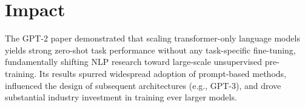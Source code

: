 \documentclass[10pt]{article}
\begin{document}
\section*{Impact}
The GPT-2 paper demonstrated that scaling transformer-only language models yields strong zero-shot task performance without any task-specific fine-tuning, fundamentally shifting NLP research toward large-scale unsupervised pre-training. Its results spurred widespread adoption of prompt-based methods, influenced the design of subsequent architectures (e.g., GPT-3), and drove substantial industry investment in training ever larger models.



\end{document}
